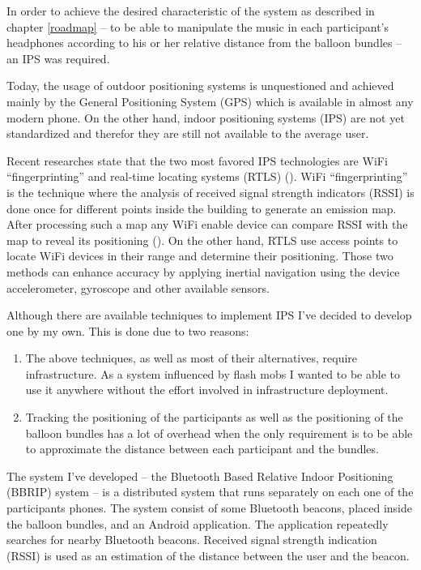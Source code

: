 In order to achieve the desired characteristic of the system as described in chapter \ref{roadmap} -- to be able to manipulate the music in each participant's headphones according to his or her relative distance from the balloon bundles -- an IPS was required.

Today, the usage of outdoor positioning systems is unquestioned and achieved mainly by the General Positioning System (GPS) which is available in almost any modern phone. On the other hand, indoor positioning systems (IPS) are not yet standardized and therefor they are still not available to the average user.

Recent researches state that the two most favored IPS technologies are WiFi ``fingerprinting'' and real-time locating systems (RTLS) (\cite{web:harrop}). WiFi ``fingerprinting'' is the technique where the analysis of received signal strength indicators (RSSI) is done once for different points inside the building to generate an emission map. After processing such a map any WiFi enable device can compare RSSI with the map to reveal its positioning (\cite{chen}). On the other hand, RTLS use access points to locate WiFi devices in their range and determine their positioning. Those two methods can enhance accuracy by applying inertial navigation using the device accelerometer, gyroscope and other available sensors.

Although there are available techniques to implement IPS I've decided to develop one by my own. This is done due to two reasons:
\begin{enumerate}
	\item The above techniques, as well as most of their alternatives, require infrastructure. As a system influenced by flash mobs I wanted to be able to use it anywhere without the effort involved in infrastructure deployment.
	\item Tracking the positioning of the participants as well as the positioning of the balloon bundles has a lot of overhead when the only requirement is to be able to approximate the distance between each participant and the bundles.
\end{enumerate}


The system I've developed -- the Bluetooth Based Relative Indoor Positioning (BBRIP) system -- is a distributed system that runs separately on each one of the participants phones. The system consist of some Bluetooth beacons, placed inside the balloon bundles, and an Android application. The application repeatedly searches for nearby Bluetooth beacons. Received signal strength indication (RSSI) is used as an estimation of the distance between the user and the beacon.


